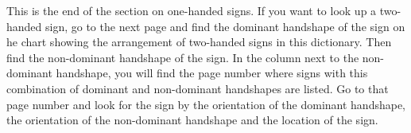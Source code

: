 \documentclass{tufte-book}
\begin{document}
\begin{fullwidth}
\newpage \noindent This is the end of the section on one-handed signs. If you want to look up a two-handed sign, go to the next page and find the dominant handshape of the sign on he chart showing the arrangement of two-handed signs in this dictionary. Then find the non-dominant handshape of the sign. In the column next to the non-dominant handshape, you will find the page number where signs with this combination of dominant and non-dominant handshapes are listed. Go to that page number and look for the sign by the orientation of the dominant handshape, the orientation of the non-dominant handshape and the location of the sign.\label{page:endonehand}

 \newpage




\end{fullwidth}
\newpage
\end{document}
